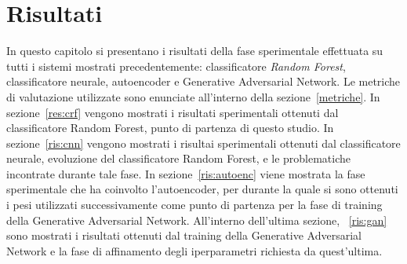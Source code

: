 \chapter{Risultati}
\label{risultati}
In questo capitolo si presentano i risultati della fase sperimentale effettuata su tutti i sistemi mostrati precedentemente: classificatore \textit{Random Forest}, classificatore neurale, autoencoder e Generative Adversarial Network. Le metriche di valutazione utilizzate sono enunciate all'interno della sezione~\ref{metriche}. In sezione~\ref{res:crf} vengono mostrati i risultati sperimentali ottenuti dal classificatore Random Forest, punto di partenza di questo studio. In sezione~\ref{ris:cnn} vengono mostrati i risultai sperimentali ottenuti dal classificatore neurale, evoluzione del classificatore Random Forest, e le problematiche incontrate durante tale fase. In sezione~\ref{ris:autoenc} viene mostrata la fase sperimentale che ha coinvolto l'autoencoder, per durante la quale si sono ottenuti i pesi utilizzati successivamente come punto di partenza per la fase di training della Generative Adversarial Network. All'interno dell'ultima sezione, ~\ref{ris:gan} sono mostrati i risultati ottenuti dal training della Generative Adversarial Network e la fase di affinamento degli iperparametri richiesta da quest'ultima.

\pagebreak
